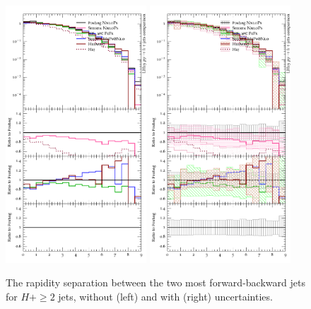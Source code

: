 \begin{figure}[t!]
  \centering
  \includegraphics[width=0.47\textwidth]{figures/hjetscomp_u_jjfb_dy.pdf}
  \hfill
  \includegraphics[width=0.47\textwidth]{figures/hjetscomp_jjfb_dy.pdf}
  \caption{
    The rapidity separation between the two most forward-backward jets
    for $H+\ge2$ jets, without (left) and with (right) uncertainties. 
    \label{fig:higgscomp:results:2obs:dyjj_fb}
  }
\end{figure}

